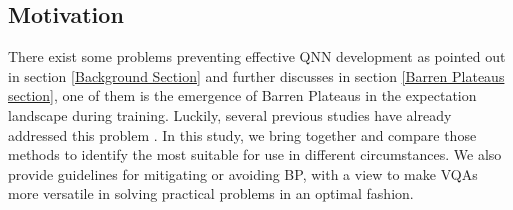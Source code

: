 \subsection{Motivation}
There exist some problems preventing effective QNN development as pointed out in section \ref{Background Section} and further discusses in section \ref{Barren Plateaus section}, one of them is the emergence of Barren Plateaus in the expectation landscape during training.
Luckily, several previous studies have already addressed this problem \cite{pesahAbsenceBarrenPlateaus2021,pattiEntanglementDevisedBarren2021,liuParameterInitializationMethod2021}.
In this study, we bring together and compare those methods to identify the most suitable for use in different circumstances.
We also provide guidelines for mitigating or avoiding BP, with a view to make VQAs more versatile in solving practical problems in an optimal fashion.